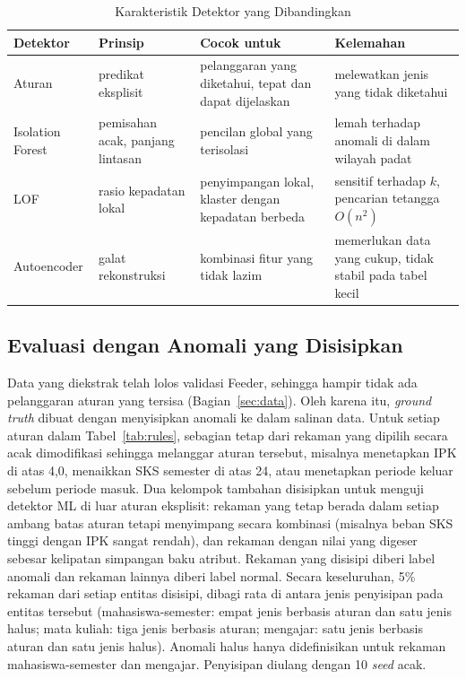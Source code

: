 \documentclass[conference]{IEEEtran}
\begin{document}
\begin{table}[htbp]
\caption{Karakteristik Detektor yang Dibandingkan}
\begin{center}
\footnotesize\setlength{\tabcolsep}{3pt}
\begin{tabular}{L{0.17\columnwidth}L{0.2\columnwidth}L{0.25\columnwidth}L{0.25\columnwidth}}
\toprule
\textbf{Detektor} & \textbf{Prinsip} & \textbf{Cocok untuk} & \textbf{Kelemahan} \\
\midrule
Aturan & predikat eksplisit & pelanggaran yang diketahui, tepat dan dapat dijelaskan & melewatkan jenis yang tidak diketahui \\
Isolation Forest & pemisahan acak, panjang lintasan & pencilan global yang terisolasi & lemah terhadap anomali di dalam wilayah padat \\
LOF & rasio kepadatan lokal & penyimpangan lokal, klaster dengan kepadatan berbeda & sensitif terhadap $k$, pencarian tetangga $O(n^2)$ \\
Autoencoder & galat rekonstruksi & kombinasi fitur yang tidak lazim & memerlukan data yang cukup, tidak stabil pada tabel kecil \\
\bottomrule
\end{tabular}
\label{tab:detectors}
\end{center}
\end{table}

\subsection{Evaluasi dengan Anomali yang Disisipkan}
Data yang diekstrak telah lolos validasi Feeder, sehingga hampir tidak ada pelanggaran aturan yang tersisa (Bagian~\ref{sec:data}). Oleh karena itu, \textit{ground truth} dibuat dengan menyisipkan anomali ke dalam salinan data. Untuk setiap aturan dalam Tabel~\ref{tab:rules}, sebagian tetap dari rekaman yang dipilih secara acak dimodifikasi sehingga melanggar aturan tersebut, misalnya menetapkan IPK di atas 4,0, menaikkan SKS semester di atas 24, atau menetapkan periode keluar sebelum periode masuk. Dua kelompok tambahan disisipkan untuk menguji detektor ML di luar aturan eksplisit: rekaman yang tetap berada dalam setiap ambang batas aturan tetapi menyimpang secara kombinasi (misalnya beban SKS tinggi dengan IPK sangat rendah), dan rekaman dengan nilai yang digeser sebesar kelipatan simpangan baku atribut. Rekaman yang disisipi diberi label anomali dan rekaman lainnya diberi label normal. Secara keseluruhan, 5\% rekaman dari setiap entitas disisipi, dibagi rata di antara jenis penyisipan pada entitas tersebut (mahasiswa-semester: empat jenis berbasis aturan dan satu jenis halus; mata kuliah: tiga jenis berbasis aturan; mengajar: satu jenis berbasis aturan dan satu jenis halus). Anomali halus hanya didefinisikan untuk rekaman mahasiswa-semester dan mengajar. Penyisipan diulang dengan 10 \textit{seed} acak.
\end{document}
